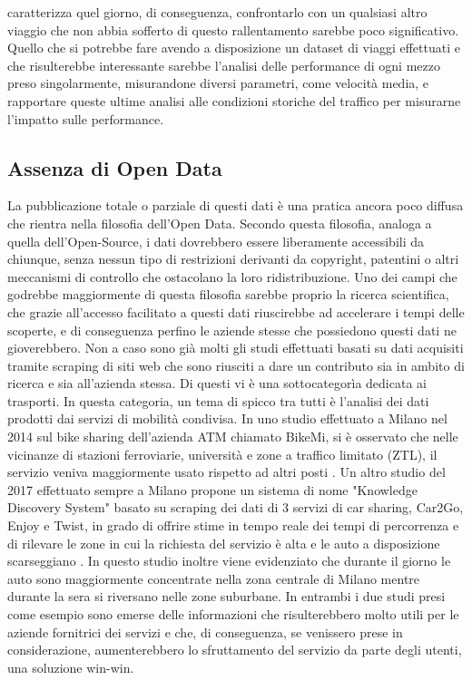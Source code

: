 caratterizza quel giorno, di conseguenza, confrontarlo con un qualsiasi altro viaggio che non abbia sofferto di questo rallentamento sarebbe poco significativo. Quello che si potrebbe fare avendo a disposizione un dataset di viaggi effettuati e che risulterebbe interessante sarebbe l'analisi delle performance di ogni mezzo preso singolarmente, misurandone diversi parametri, come velocità media, e rapportare queste ultime analisi alle condizioni storiche del traffico per misurarne l'impatto sulle performance.

\subsection{Assenza di Open Data}

La pubblicazione totale o parziale di questi dati è una pratica ancora poco diffusa che rientra nella filosofia dell'Open Data. Secondo questa filosofia, analoga a quella dell'Open-Source, i dati dovrebbero essere liberamente accessibili da chiunque, senza nessun tipo di restrizioni derivanti da copyright, patentini o altri meccanismi di controllo che ostacolano la loro ridistribuzione. Uno dei campi che godrebbe maggiormente di questa filosofia sarebbe proprio la ricerca scientifica, che grazie all'accesso facilitato a questi dati riuscirebbe ad accelerare i tempi delle scoperte, e di conseguenza perfino le aziende stesse che possiedono questi dati ne gioverebbero. Non a caso sono già molti gli studi effettuati basati su dati acquisiti tramite scraping di siti web che sono riusciti a dare un contributo sia in ambito di ricerca e sia all'azienda stessa. Di questi vi è una sottocategorìa dedicata ai trasporti. In questa categoria, un tema di spicco tra tutti è l'analisi dei dati prodotti dai servizi di mobilità condivisa. In uno studio effettuato a Milano nel 2014 sul bike sharing dell'azienda ATM chiamato BikeMi, si è osservato che nelle vicinanze di stazioni ferroviarie, università e zone a traffico limitato (ZTL), il servizio veniva maggiormente usato rispetto ad altri posti \cite{croci2014optimizing}. Un altro studio del 2017 effettuato sempre a Milano propone un sistema di nome "Knowledge Discovery System" basato su scraping dei dati di 3 servizi di car sharing, Car2Go, Enjoy e Twist, in grado di offrire stime in tempo reale dei tempi di percorrenza e di rilevare le zone in cui la richiesta del servizio è alta e le auto a disposizione scarseggiano \cite{pagani2017knowledge}. In questo studio inoltre viene evidenziato che durante il giorno le auto sono maggiormente concentrate nella zona centrale di Milano mentre durante la sera si riversano nelle zone suburbane. In entrambi i due studi presi come esempio sono emerse delle informazioni che risulterebbero molto utili per le aziende fornitrici dei servizi e che, di conseguenza, se venissero prese in considerazione, aumenterebbero lo sfruttamento del servizio da parte degli utenti, una soluzione win-win.

